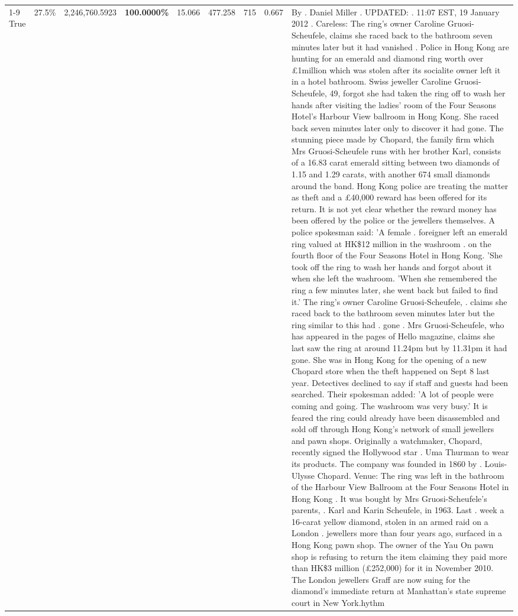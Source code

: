 \begin{table}[H]
\begin{tabular}{lllrlllll}
\cline{1-9}
True & 27.5\% & 2,246,760.5923 & \bfseries \color{red} 100.0000\% & 15.066 & 477.258 & 715 & 0.667 & By . Daniel Miller . UPDATED: . 11:07 EST, 19 January 2012 . Careless: The ring's owner Caroline Gruosi-Scheufele, claims she raced back to the bathroom seven minutes later but it had vanished . Police in Hong Kong are hunting for an emerald and diamond ring worth over £1million which was stolen after its socialite owner left it in a hotel bathroom. Swiss jeweller Caroline Gruosi-Scheufele, 49, forgot she had taken the ring off to wash her hands after visiting the ladies' room of the Four Seasons Hotel's Harbour View ballroom in Hong Kong. She raced back seven minutes later only to discover it had gone. The stunning piece made by Chopard, the family firm which Mrs Gruosi-Scheufele runs with her brother Karl, consists of a 16.83 carat emerald sitting between two diamonds of 1.15 and 1.29 carats, with another 674 small diamonds around the band. Hong Kong police are treating the matter as theft and a £40,000 reward has been offered for its return. It is not yet clear whether the reward money has been offered by the police or the jewellers themselves. A police spokesman said: 'A female . foreigner left an emerald ring valued at HK\$12 million in the washroom . on the fourth floor of the Four Seasons Hotel in Hong Kong. 'She took off the ring to wash her hands and forgot about it when she left the washroom. 'When she remembered the ring a few minutes later, she went back but failed to find it.' The ring's owner Caroline Gruosi-Scheufele, . claims she raced back to the bathroom seven minutes later but the ring similar to this had . gone . Mrs Gruosi-Scheufele, who has appeared in the pages of Hello magazine, claims she last saw the ring at around 11.24pm but by 11.31pm it had gone. She was in Hong Kong for the opening of a new Chopard store when the theft happened on Sept 8 last year. Detectives declined to say if staff and guests had been searched. Their spokesman added: 'A lot of people were coming and going. The washroom was very busy.' It is feared the ring could already have been disassembled and sold off through Hong Kong's network of small jewellers and pawn shops. Originally a watchmaker, Chopard, recently signed the Hollywood star . Uma Thurman to wear its products. The company was founded in 1860 by . Louis-Ulysse Chopard. Venue: The ring was left in the bathroom of the Harbour View Ballroom at the Four Seasons Hotel in Hong Kong . It was bought by Mrs Gruosi-Scheufele's  parents, . Karl and Karin Scheufele, in 1963. Last . week a 16-carat yellow diamond, stolen in an armed raid on a London . jewellers more than four years ago, surfaced in a Hong Kong pawn shop. The owner of the Yau On pawn shop is refusing to return the item claiming they paid more than HK\$3 million (£252,000) for it in November 2010. The London jewellers Graff are now suing for the diamond’s immediate return at Manhattan’s state supreme court in New York.hythm \\

\end{tabular}
\end{table}
